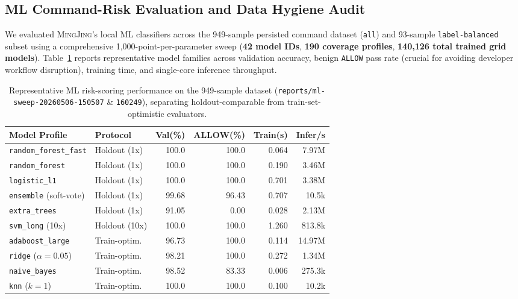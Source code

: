 \documentclass[10pt,twocolumn,letterpaper]{article}
\newcommand{\sys}{\textsc{MingJing}}
\newcommand{\code}[1]{\texttt{\small #1}}
\begin{document}
\subsection{ML Command-Risk Evaluation and Data Hygiene Audit}
We evaluated \sys{}'s local ML classifiers across the 949-sample persisted command dataset (\code{all}) and 93-sample \code{label-balanced} subset using a comprehensive 1,000-point-per-parameter sweep (\textbf{42 model IDs}, \textbf{190 coverage profiles}, \textbf{140,126 total trained grid models}). Table~\ref{tab:ml} reports representative model families across validation accuracy, benign \code{ALLOW} pass rate (crucial for avoiding developer workflow disruption), training time, and single-core inference throughput.

\begin{table}[t]
\centering
\scriptsize
\setlength{\tabcolsep}{2.8pt}
\caption{Representative ML risk-scoring performance on the 949-sample dataset (\code{reports/ml-sweep-20260506-150507} \& \code{160249}), separating holdout-comparable from train-set-optimistic evaluators.}
\label{tab:ml}
\begin{tabular}{@{}llrrrr@{}}
\toprule
\textbf{Model Profile} & \textbf{Protocol} & \textbf{Val(\%)} & \textbf{ALLOW(\%)} & \textbf{Train(s)} & \textbf{Infer/s} \\
\midrule
\code{random\_forest\_fast} & Holdout (1x)   & 100.0 & 100.0 & 0.064 & 7.97M \\
\code{random\_forest}       & Holdout (1x)   & 100.0 & 100.0 & 0.190 & 3.46M \\
\code{logistic\_l1}         & Holdout (1x)   & 100.0 & 100.0 & 0.701 & 3.38M \\
\code{ensemble} (soft-vote) & Holdout (1x)   & 99.68 & 96.43 & 0.707 & 10.5k \\
\code{extra\_trees}         & Holdout (1x)   & 91.05 & 0.00  & 0.028 & 2.13M \\
\code{svm\_long} (10x)      & Holdout (10x)  & 100.0 & 100.0 & 1.260 & 813.8k \\
\midrule
\code{adaboost\_large}      & Train-optim.   & 96.73 & 100.0 & 0.114 & 14.97M \\
\code{ridge} ($\alpha=0.05$)& Train-optim.   & 98.21 & 100.0 & 0.272 & 1.34M \\
\code{naive\_bayes}         & Train-optim.   & 98.52 & 83.33 & 0.006 & 275.3k \\
\code{knn} ($k=1$)          & Train-optim.   & 100.0 & 100.0 & 0.100 & 10.2k \\
\bottomrule
\end{tabular}
\end{table}
\end{document}
